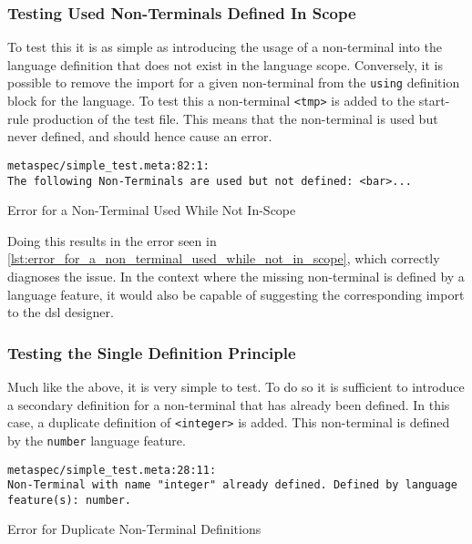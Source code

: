 \subsubsection{Testing Used Non-Terminals Defined In Scope} %
\label{ssub:testing_used_non_terminals_defined_in_scope}
To test this it is as simple as introducing the usage of a non-terminal into the language definition that does not exist in the language scope. 
Conversely, it is possible to remove the import for a given non-terminal from the \texttt{using} definition block for the language.
To test this a non-terminal \texttt{<tmp>} is added to the start-rule production of the test file. 
This means that the non-terminal is used but never defined, and should hence cause an error.

\begin{listing}[!htb]
\begin{verbatim}
metaspec/simple_test.meta:82:1:
The following Non-Terminals are used but not defined: <bar>... 
\end{verbatim}
\caption{Error for a Non-Terminal Used While Not In-Scope}
\label{lst:error_for_a_non_terminal_used_while_not_in_scope}
\end{listing}

Doing this results in the error seen in \autoref{lst:error_for_a_non_terminal_used_while_not_in_scope}, which correctly diagnoses the issue.
In the context where the missing non-terminal is defined by a language feature, it would also be capable of suggesting the corresponding import to the \gls{dsl} designer.


\subsubsection{Testing the Single Definition Principle} %
\label{ssub:testing_the_single_definition_principle}
Much like the above, it is very simple to test.
To do so it is sufficient to introduce a secondary definition for a non-terminal that has already been defined. 
In this case, a duplicate definition of \texttt{<integer>} is added.
This non-terminal is defined by the \texttt{number} language feature.

\begin{listing}[!htb]
\begin{verbatim}
metaspec/simple_test.meta:28:11:
Non-Terminal with name "integer" already defined. Defined by language feature(s): number.
\end{verbatim}
\caption{Error for Duplicate Non-Terminal Definitions}
\label{lst:error_for_duplicate_non_terminal_definitions}
\end{listing}

